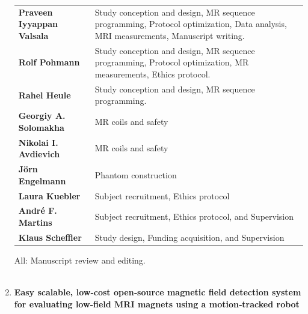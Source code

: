 \begin{enumerate}
	\begin{table}[h!]
		\centering
		\begin{tabularx}{\textwidth}{>{\bfseries}m{3.5cm} >{\arraybackslash}X }
			Praveen Iyyappan Valsala & Study conception and design, MR sequence programming, Protocol optimization, Data analysis, MRI measurements, Manuscript writing. \\
			Rolf Pohmann & Study conception and design, MR sequence programming, Protocol optimization, MR measurements, Ethics protocol. \\
			Rahel Heule & Study conception and design, MR sequence programming. \\
			Georgiy A. Solomakha & MR coils and safety \\
			Nikolai I. Avdievich & MR coils and safety \\
			Jörn Engelmann & Phantom construction \\
			Laura Kuebler & Subject recruitment, Ethics protocol \\
			André F. Martins & Subject recruitment, Ethics protocol, and Supervision \\
			Klaus Scheffler & Study design, Funding acquisition, and Supervision \\
		\end{tabularx}
	\end{table}
	
	All: Manuscript review and editing.
	\\
	\\
	
	\item \textbf{Easy scalable, low‐cost open‐source magnetic field detection system for evaluating low‐field MRI magnets using a motion‐tracked robot}
	

\end{enumerate}

